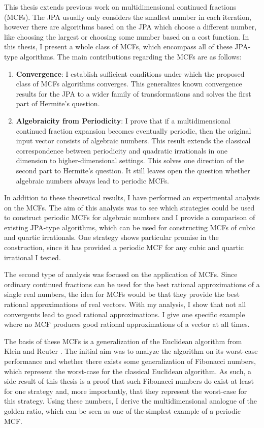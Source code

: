 This thesis extends previous work on multidimensional continued fractions (MCFs).
The JPA usually only considers the smallest number in each iteration,
however there are algorithms based on the JPA which choose a different number,
like choosing the largest or choosing some number based on a cost function.
In this thesis, I present a whole class of MCFs,
which encompass all of these JPA-type algorithms.
The main contributions regarding the MCFs are as follows:
\begin{enumerate}
  \item \textbf{Convergence}:
    I establish sufficient conditions under which the proposed class of MCFs
    algorithms converges.
    This generalizes known convergence results for the JPA to a wider family of
    transformations and solves the first part of Hermite's question.
  \item \textbf{Algebraicity from Periodicity}:
    I prove that if a multidimensional continued fraction expansion becomes
    eventually periodic, then the original input vector consists of algebraic
    numbers.
    This result extends the classical correspondence between periodicity and
    quadratic irrationals in one dimension to higher-dimensional settings.
    This solves one direction of the second part to Hermite's question.
    It still leaves open the question whether algebraic numbers always lead to
    periodic MCFs.
\end{enumerate}

In addition to these theoretical results,
I have performed an experimental analysis on the MCFs.
The aim of this analysis was to see which strategies could be used
to construct periodic MCFs for algebraic numbers
and I provide a comparison of existing JPA-type algorithms,
which can be used for constructing MCFs of cubic and quartic irrationals.
One strategy shows particular promise in the construction,
since it has provided a periodic MCF for any cubic and quartic irrational I tested.

The second type of analysis was focused on the application of MCFs.
Since ordinary continued fractions can be used for the best rational approximations
of a single real numbers, the idea for MCFs would be that they provide the best
rational approximations of real vectors.
With my analysis, I show that not all convergents lead to good rational approximations.
I give one specific example where no MCF produces good rational
approximations of a vector at all times.

The basis of these MCFs is a generalization of the Euclidean algorithm from
Klein and Reuter \cite{Klein24}.
The initial aim was to analyze the algorithm on its worst-case performance
and whether there exists some generalization of Fibonacci numbers,
which represent the worst-case for the classical Euclidean algorithm.
As such, a side result of this thesis is a proof that such Fibonacci numbers do
exist at least for one strategy and, more importantly, that they represent the
worst-case for this strategy.
Using these numbers, I derive the multidimensional analogue of the golden
ratio, which can be seen as one of the simplest example of a periodic MCF.

